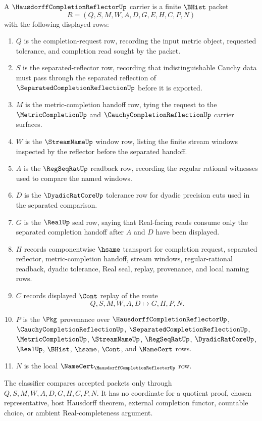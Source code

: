 \begin{definition}
\label{def:hausdorff-completion-reflector-carrier}
A $\HausdorffCompletionReflectorUp$ carrier is a finite $\BHist$ packet
$$
R=(Q,S,M,W,A,D,G,E,H,C,P,N)
$$
with the following displayed rows:
\begin{enumerate}
\item $Q$ is the completion-request row, recording the input metric object, requested tolerance, and completion read sought by the packet.
\item $S$ is the separated-reflector row, recording that indistinguishable Cauchy data must pass through the separated reflection of $\SeparatedCompletionReflectionUp$ before it is exported.
\item $M$ is the metric-completion handoff row, tying the request to the $\MetricCompletionUp$ and $\CauchyCompletionReflectionUp$ carrier surfaces.
\item $W$ is the $\StreamNameUp$ window row, listing the finite stream windows inspected by the reflector before the separated handoff.
\item $A$ is the $\RegSeqRatUp$ readback row, recording the regular rational witnesses used to compare the named windows.
\item $D$ is the $\DyadicRatCoreUp$ tolerance row for dyadic precision cuts used in the separated comparison.
\item $G$ is the $\RealUp$ seal row, saying that Real-facing reads consume only the separated completion handoff after $A$ and $D$ have been displayed.
\item $H$ records componentwise $\hsame$ transport for completion request, separated reflector, metric-completion handoff, stream windows, regular-rational readback, dyadic tolerance, Real seal, replay, provenance, and local naming rows.
\item $C$ records displayed $\Cont$ replay of the route
$$
Q,S,M,W,A,D \longmapsto G,H,P,N .
$$
\item $P$ is the $\Pkg$ provenance over $\HausdorffCompletionReflectorUp$, $\CauchyCompletionReflectionUp$, $\SeparatedCompletionReflectionUp$, $\MetricCompletionUp$, $\StreamNameUp$, $\RegSeqRatUp$, $\DyadicRatCoreUp$, $\RealUp$, $\BHist$, $\hsame$, $\Cont$, and $\NameCert$ rows.
\item $N$ is the local $\NameCert_{\HausdorffCompletionReflectorUp}$ row.
\end{enumerate}
The classifier compares accepted packets only through $Q,S,M,W,A,D,G,H,C,P,N$. It has no coordinate for a quotient proof, chosen representative, host Hausdorff theorem, external completion functor, countable choice, or ambient Real-completeness argument.
\end{definition}

